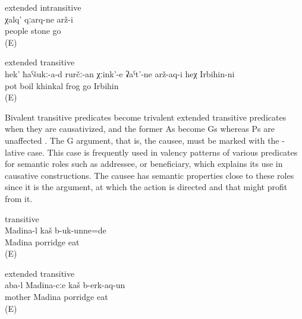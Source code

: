 \begin{exe}

	\ex	\label{ex:The people turned into stones2} extended intransitive\\
	\gll	χalq'	qːarq-ne	arž-i\\
		people	stone	go\\
	\glt	{} (E)

	\ex	\label{ex:‎‎‎Irbihin turned the khinkal that was boiling in the pot into frogs} extended transitive\\
	\gll	hek'	ħaˁšukː-a-d	rurčː-an	χːink'-e	ʡaˁt'-ne	arž-aq-i	heχ	Irbihin-ni\\
			pot	boil	khinkal\tsc{-pl}	frog	go		Irbihin\\
	\glt	{} (E)
\end{exe}

Bivalent transitive predicates become trivalent extended transitive predicates when they are causativized, and the former As become Gs whereas Ps are unaffected . The G argument, that is, the causee, must be marked with the -lative case. This case is frequently used in valency patterns of various predicates for semantic roles such as addressee,  or beneficiary, which explains its use in causative constructions. The causee has semantic properties close to these roles since it is the argument, at which the action is directed and that might profit from it. 

\begin{exe}
	\ex	\label{ex:Madina, mother, and the porridge}
	\begin{xlist}
		\ex	\label{ex:Madina was eating porridge} transitive \\
		\gll	Madina-l	kaš	b-uk-unne=de\\
			Madina	porridge	eat\\
		\glt	{} (E)

		\ex	\label{ex:Mother made Madina eat porridge} extended transitive \\
		\gll	aba-l	Madina-cːe	kaš	b-erk-aq-un\\
			mother	Madina	porridge	eat\\
		\glt	{} (E)
	\end{xlist}
\end{exe}




